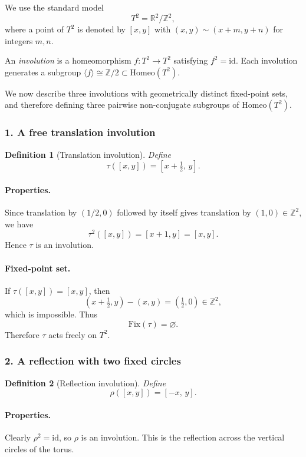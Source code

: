 \documentclass[12pt,a4paper]{article}
\theoremstyle{plain}
\newtheorem{definition}{Definition}
\theoremstyle{definition}      %
\begin{document}
We use the standard model
\[
T^{2} = \mathbb{R}^{2}/\mathbb{Z}^{2},
\]
where a point of \(T^{2}\) is denoted by \([x,y]\) with 
\((x,y)\sim(x+m,y+n)\) for integers \(m,n\).

An \emph{involution} is a homeomorphism \(f:T^{2}\to T^{2}\) satisfying 
\(f^{2}=\mathrm{id}\).  
Each involution generates a subgroup 
\(\langle f\rangle\cong\mathbb{Z}/2\subset\mathrm{Homeo}(T^{2})\).

We now describe three involutions with geometrically distinct fixed-point
sets, and therefore defining three pairwise non-conjugate subgroups of 
\(\mathrm{Homeo}(T^{2})\).

\subsubsection*{1. A free translation involution}

\begin{definition}[Translation involution]
	Define
	\[
	\tau([x,y]) = [x+\tfrac12,\,y].
	\]
\end{definition}

\paragraph{Properties.}
Since translation by \((1/2,0)\) followed by itself gives translation 
by \((1,0)\in\mathbb{Z}^{2}\), we have
\[
\tau^{2}([x,y]) = [x+1,y] = [x,y].
\]
Hence \(\tau\) is an involution.

\paragraph{Fixed-point set.}
If \(\tau([x,y])=[x,y]\), then
\[
(x+\tfrac12,y)-(x,y) = (\tfrac12,0)\in\mathbb{Z}^{2},
\]
which is impossible.  
Thus
\[
\mathrm{Fix}(\tau)=\varnothing.
\]
Therefore \(\tau\) acts freely on \(T^{2}\).

\subsubsection*{2. A reflection with two fixed circles}

\begin{definition}[Reflection involution]
	Define
	\[
	\rho([x,y]) = [-x,\,y].
	\]
\end{definition}

\paragraph{Properties.}
Clearly \(\rho^{2}=\mathrm{id}\), so \(\rho\) is an involution.  
This is the reflection across the vertical circles of the torus.
\end{document}
